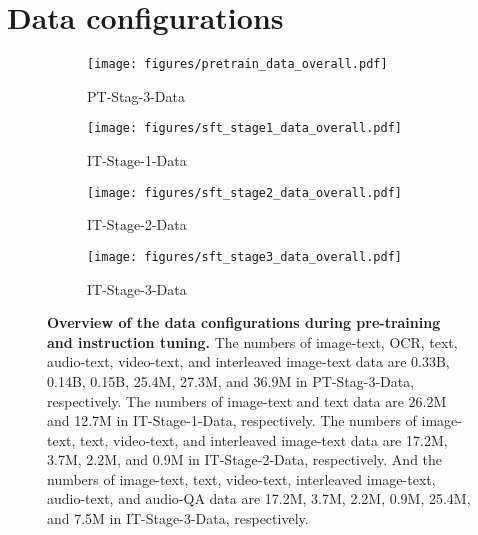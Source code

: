 \section{Data configurations}\label{subsec:app_data}

\begin{figure}[t]
    \centering
    \begin{subfigure}{0.45\textwidth}
        \centering
        \texttt{[image: figures/pretrain\_data\_overall.pdf]}
        \vspace{-8pt}
        \caption{PT-Stag-3-Data}
        \label{fig:PT-Stage-3-Data}
    \end{subfigure}
    \begin{subfigure}{0.45\textwidth}
        \centering
        \texttt{[image: figures/sft\_stage1\_data\_overall.pdf]}
        \vspace{-8pt}
        \caption{IT-Stage-1-Data}
        \label{fig:IT-Stage-1-Data}
    \end{subfigure}
    \begin{subfigure}{0.45\textwidth}
        \centering
        \texttt{[image: figures/sft\_stage2\_data\_overall.pdf]}
        \vspace{-8pt}
        \caption{IT-Stage-2-Data}
        \label{fig:IT-Stage-2-Data}
    \end{subfigure}
    \begin{subfigure}{0.45\textwidth}
        \centering
        \texttt{[image: figures/sft\_stage3\_data\_overall.pdf]}
        \vspace{-8pt}
        \caption{IT-Stage-3-Data}
        \label{fig:IT-Stage-3-Data}
    \end{subfigure}
    \caption{
    \textbf{Overview of the data configurations during pre-training and instruction tuning.}
    The numbers of image-text, OCR, text, audio-text, video-text, and interleaved image-text data are 0.33B, 0.14B, 0.15B, 25.4M, 27.3M, and 36.9M in PT-Stag-3-Data, respectively.
    The numbers of image-text and text data are 26.2M and 12.7M in IT-Stage-1-Data, respectively.
    The numbers of image-text, text, video-text, and interleaved image-text data are 17.2M, 3.7M, 2.2M, and 0.9M in IT-Stage-2-Data, respectively.
    And the numbers of image-text, text, video-text, interleaved image-text, audio-text, and audio-QA data are 17.2M, 3.7M, 2.2M, 0.9M, 25.4M, and 7.5M in IT-Stage-3-Data, respectively.
    }
    \label{fig:data_configurations}
\end{figure}

